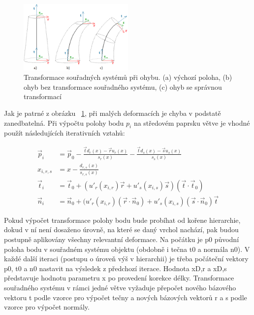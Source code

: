 	 
\begin{figure}[!hbt]
\begin{center}
\includegraphics[width=0.5\textwidth]{./figures/branchBend.png}
\end{center}
\caption[Transformace souřadných systémů při ohybu]%
{Transformace souřadných systémů při ohybu.
(a) výchozí poloha, (b) ohyb bez transformace souřadného systému, (c) ohyb se správnou transformací
\label{fig:bendCoordSys}
}
\end{figure}

Jak je patrné z obrázku ~\ref{fig:bendCoordSys}, při malých deformacích je chyba v podstatě zanedbatelná. Při výpočtu polohy bodu $p_i$ na středovém paprsku větve je vhodné použít následujících iterativních vztahů:

\begin{align} 
\vec{p}_{i} &= \vec{p}_{0} - \frac{\vec{t}d_{r}(x)-\vec{r}u_{r}(x)}{s_{r}(x)}-\frac{\vec{t}d_{s}(x)-\vec{s}u_{s}(x)}{s_{s}(x)}\nonumber\\
x_{i,r,s} &= x - \frac{d_{r,s}(x)}{s_{r,s}(x)}\nonumber\\
\vec{t}_{i} &=  \vec{t}_{0} + (u'_{r}(x_{i,r})\vec{r} + u'_{s}(x_{i,s})\vec{s})(\vec{t}\cdot\vec{t}_{0})\\
\vec{n}_{i} &=  \vec{n}_{0} + (u'_{r}(x_{i,r})(\vec{r} \cdot \vec{n}_{0}) + u'_{s}(x_{i,s})(\vec{s} \cdot \vec{n}_{0})\vec{t}
\end{align}

Pokud výpočet transformace polohy bodu bude probíhat od kořene hierarchie, dokud v ní není dosaženo úrovně, na které se daný vrchol nachází, pak budou postupně aplikovány všechny relevantní deformace. Na počátku je p0 původní poloha bodu v souřadném systému objektu (obdobně i tečna t0  a normála n0). V každé další iteraci (postupu o úroveň výš v hierarchii) je třeba počáteční vektory p0, t0 a n0 nastavit na výsledek z předchozí iterace. Hodnota xD,r a xD,s představuje hodnotu parametru x po provedení korekce délky.  Transformace souřadného systému v rámci jedné větve vyžaduje přepočet nového bázového vektoru t podle vzorce pro výpočet tečny a nových bázových vektorů r a s podle vzorce pro výpočet normály. 


